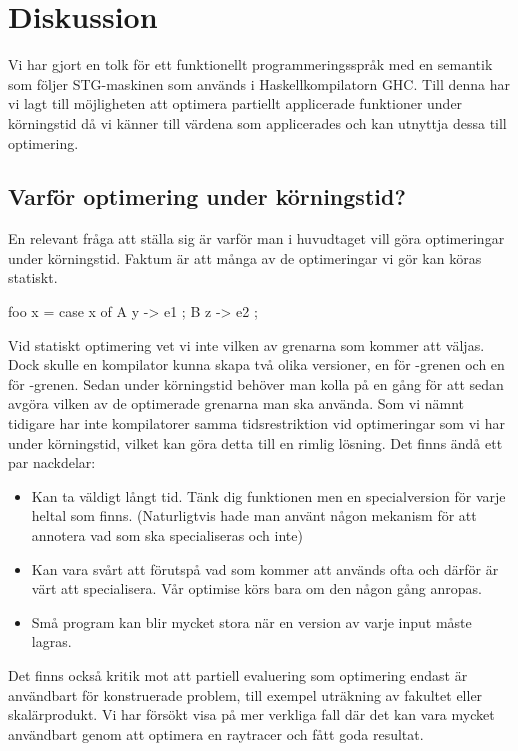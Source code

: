 \documentclass[Rapport]{subfiles}
\begin{document}
\section{Diskussion}
    
Vi har gjort en tolk för ett funktionellt programmeringsspråk
med en semantik som följer STG-maskinen som används i Haskellkompilatorn GHC.
Till denna har vi lagt till möjligheten att optimera partiellt applicerade funktioner under körningstid
då vi känner till värdena som applicerades och kan utnyttja dessa till optimering.

\subsection{Varför optimering under körningstid?}

En relevant fråga att ställa sig är varför man i huvudtaget vill göra optimeringar under körningstid. Faktum är att många av de optimeringar vi gör kan köras statiskt.

\begin{codeEx}

foo x = case x of
        { A y  -> e1
        ; B z  -> e2
        };

\end{codeEx}

Vid statiskt optimering vet vi inte vilken av grenarna som kommer att väljas. Dock skulle en kompilator kunna skapa två olika versioner, en för -grenen och en för 
-grenen. Sedan under körningstid behöver man kolla på  en gång för att sedan avgöra vilken av de optimerade grenarna man ska använda.
Som vi nämnt tidigare har inte kompilatorer samma tidsrestriktion vid optimeringar som vi har under körningstid, vilket kan göra detta till en rimlig lösning. Det finns ändå ett par nackdelar:
\begin{itemize}
    \item Kan ta väldigt långt tid. Tänk dig  funktionen men en specialversion för varje heltal som finns. (Naturligtvis hade man använt någon mekanism för att annotera vad som ska specialiseras och inte)
    \item Kan vara svårt att förutspå vad som kommer att används ofta och därför är värt att specialisera. Vår optimise körs bara om den någon gång anropas.
    \item Små program kan blir mycket stora när en version av varje input måste lagras.
\end{itemize}


Det finns också kritik mot att partiell evaluering som optimering endast är användbart för konstruerade problem, till exempel uträkning av fakultet eller skalärprodukt. Vi har försökt visa på mer verkliga fall där det kan vara mycket användbart genom att optimera en raytracer och fått goda resultat. 
\end{document}
